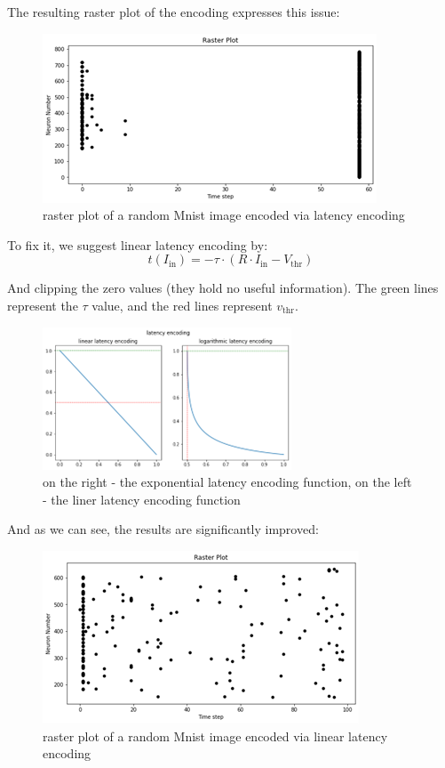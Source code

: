 The resulting raster plot of the encoding expresses this issue:

\begin{figure}[H]
    \centering
    \includegraphics[width=0.8\linewidth]{methods/spike-encoding/graphs/latency-encoding-raster.png}
    \caption{raster plot of a random Mnist image encoded via latency encoding}
    \label{fig:latency-encoding-raster}
\end{figure}

To fix it, we suggest linear latency encoding by:
\begin{equation}
t(I_{\text{in}}) = -\tau \cdot \left(R \cdot I_{\text{in}} - V_{\text{thr}}\right)
\end{equation}

And clipping the zero values (they hold no useful information). The green lines represent the $\tau$ value, and the red lines represent $v_{\text{thr}}$.

\begin{figure}[H]
    \centering
    \includegraphics[width=0.5\linewidth]{methods/spike-encoding/graphs/exp-to-linear.png}
    \caption{on the right - the exponential latency encoding function, on the left - the liner latency encoding function}
    \label{fig:latency-exp-vs-lin}
\end{figure}

And as we can see, the results are significantly improved:

\begin{figure}[H]
    \centering
    \includegraphics[width=0.7\linewidth]{methods/spike-encoding/graphs/latency-encoding-raster-linear.png}
    \caption{ raster plot of a random Mnist image encoded via linear latency encoding}
    \label{fig:latency-encoding-raster-linear}
\end{figure}